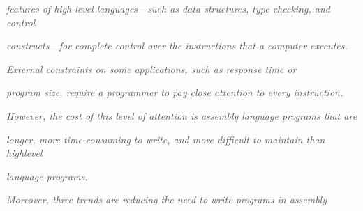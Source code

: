 \documentclass[12pt]{article}
\begin{document}
\begin{adjustwidth}{0.5in}{0.0in}
\textit{\textcolor[HTML]{525252}{features of high-level languages—such as data structures, type checking, and control}}\par

\end{adjustwidth}

\begin{adjustwidth}{0.5in}{0.0in}
\textit{\textcolor[HTML]{525252}{constructs—for complete control over the instructions that a computer executes.}}\par

\end{adjustwidth}

\begin{adjustwidth}{0.5in}{0.0in}
\textit{\textcolor[HTML]{525252}{External constraints on some applications, such as response time or}}\par

\end{adjustwidth}

\begin{adjustwidth}{0.5in}{0.0in}
\textit{\textcolor[HTML]{525252}{program size, require a programmer to pay close attention to every instruction.}}\par

\end{adjustwidth}

\begin{adjustwidth}{0.5in}{0.0in}
\textit{\textcolor[HTML]{525252}{However, the cost of this level of attention is assembly language programs that are}}\par

\end{adjustwidth}

\begin{adjustwidth}{0.5in}{0.0in}
\textit{\textcolor[HTML]{525252}{longer, more time-consuming to write, and more difficult to maintain than highlevel}}\par

\end{adjustwidth}

\begin{adjustwidth}{0.5in}{0.0in}
\textit{\textcolor[HTML]{525252}{language programs.}}\par

\end{adjustwidth}

\begin{adjustwidth}{0.5in}{0.0in}
\textit{\textcolor[HTML]{525252}{Moreover, three trends are reducing the need to write programs in assembly}}\par

\end{adjustwidth}
\end{document}
